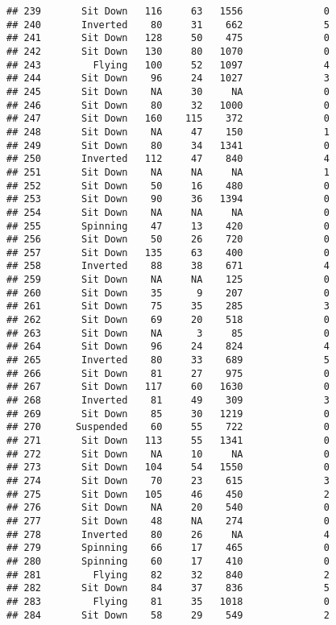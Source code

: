 \documentclass[
]{article}
\begin{document}
\begin{verbatim}
## 239       Sit Down   116     63   1556              0
## 240       Inverted    80     31    662              5
## 241       Sit Down   128     50    475              0
## 242       Sit Down   130     80   1070              0
## 243         Flying   100     52   1097              4
## 244       Sit Down    96     24   1027              3
## 245       Sit Down    NA     30     NA              0
## 246       Sit Down    80     32   1000              0
## 247       Sit Down   160    115    372              0
## 248       Sit Down    NA     47    150              1
## 249       Sit Down    80     34   1341              0
## 250       Inverted   112     47    840              4
## 251       Sit Down    NA     NA     NA              1
## 252       Sit Down    50     16    480              0
## 253       Sit Down    90     36   1394              0
## 254       Sit Down    NA     NA     NA              0
## 255       Spinning    47     13    420              0
## 256       Sit Down    50     26    720              0
## 257       Sit Down   135     63    400              0
## 258       Inverted    88     38    671              4
## 259       Sit Down    NA     NA    125              0
## 260       Sit Down    35      9    207              0
## 261       Sit Down    75     35    285              3
## 262       Sit Down    69     20    518              0
## 263       Sit Down    NA      3     85              0
## 264       Sit Down    96     24    824              4
## 265       Inverted    80     33    689              5
## 266       Sit Down    81     27    975              0
## 267       Sit Down   117     60   1630              0
## 268       Inverted    81     49    309              3
## 269       Sit Down    85     30   1219              0
## 270      Suspended    60     55    722              0
## 271       Sit Down   113     55   1341              0
## 272       Sit Down    NA     10     NA              0
## 273       Sit Down   104     54   1550              0
## 274       Sit Down    70     23    615              3
## 275       Sit Down   105     46    450              2
## 276       Sit Down    NA     20    540              0
## 277       Sit Down    48     NA    274              0
## 278       Inverted    80     26     NA              4
## 279       Spinning    66     17    465              0
## 280       Spinning    60     17    410              0
## 281         Flying    82     32    840              2
## 282       Sit Down    84     37    836              5
## 283         Flying    81     35   1018              0
## 284       Sit Down    58     29    549              2

\end{verbatim}
\end{document}

